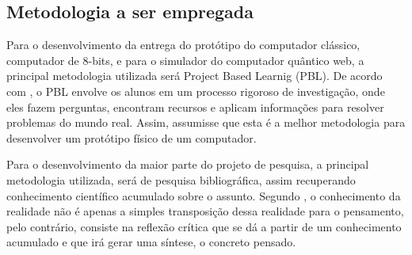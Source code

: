 \begin{samepage}
    \subsection{Metodologia a ser empregada}
    Para o desenvolvimento da entrega do protótipo do computador clássico, computador de 8-bits, e para o simulador do computador quântico web, a principal metodologia utilizada será Project Based Learnig (PBL). De acordo com \cite{GrandRapidsBusinessJournalPBL}, o PBL envolve os alunos em um processo rigoroso de investigação, onde eles fazem perguntas, encontram recursos e aplicam informações para resolver problemas do mundo real. Assim, assumisse que esta é a melhor metodologia para desenvolver um protótipo físico de um computador.\par
	Para o desenvolvimento da maior parte do projeto de pesquisa, a principal metodologia utilizada, será de pesquisa bibliográfica, assim recuperando conhecimento científico acumulado sobre o assunto. Segundo \cite{APesquisaBibliografica}, o conhecimento da realidade não é apenas a simples transposição dessa realidade para o pensamento, pelo contrário, consiste na reflexão crítica que se dá a partir de um conhecimento acumulado e que irá gerar uma síntese, o concreto pensado.

\end{samepage}
\newpage